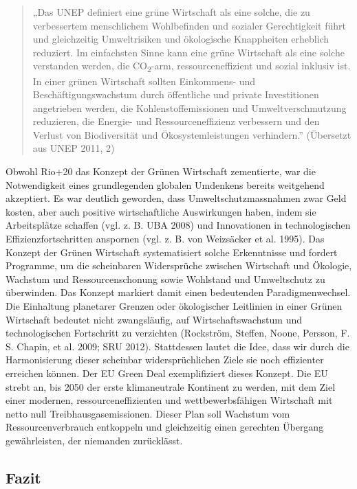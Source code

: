 \documentclass[
  nswissgerman,
  a4paper,
  DIV=11,
  numbers=noendperiod,
  oneside,
  openany]{scrreprt}
\begin{document}
\begin{quote}
„Das UNEP definiert eine grüne Wirtschaft als eine solche, die zu
verbessertem menschlichem Wohlbefinden und sozialer Gerechtigkeit führt
und gleichzeitig Umweltrisiken und ökologische Knappheiten erheblich
reduziert. Im einfachsten Sinne kann eine grüne Wirtschaft als eine
solche verstanden werden, die CO\textsubscript{2}-arm,
ressourceneffizient und sozial inklusiv ist. In einer grünen Wirtschaft
sollten Einkommens- und Beschäftigungswachstum durch öffentliche und
private Investitionen angetrieben werden, die Kohlenstoffemissionen und
Umweltverschmutzung reduzieren, die Energie- und Ressourceneffizienz
verbessern und den Verlust von Biodiversität und Ökosystemleistungen
verhindern.'' (Übersetzt aus UNEP 2011, 2)
\end{quote}

Obwohl Rio+20 das Konzept der Grünen Wirtschaft zementierte, war die
Notwendigkeit eines grundlegenden globalen Umdenkens bereits weitgehend
akzeptiert. Es war deutlich geworden, dass Umweltschutzmassnahmen zwar
Geld kosten, aber auch positive wirtschaftliche Auswirkungen haben,
indem sie Arbeitsplätze schaffen (vgl. z. B. UBA 2008) und Innovationen
in technologischen Effizienzfortschritten anspornen (vgl. z. B. {von
Weizsäcker et al.} 1995). Das Konzept der Grünen Wirtschaft
systematisiert solche Erkenntnisse und fordert Programme, um die
scheinbaren Widersprüche zwischen Wirtschaft und Ökologie, Wachstum und
Ressourcenschonung sowie Wohlstand und Umweltschutz zu überwinden. Das
Konzept markiert damit einen bedeutenden Paradigmenwechsel. Die
Einhaltung planetarer Grenzen oder ökologischer Leitlinien in einer
Grünen Wirtschaft bedeutet nicht zwangsläufig, auf Wirtschaftswachstum
und technologischen Fortschritt zu verzichten (Rockström, Steffen,
Noone, Persson, F. S. Chapin, et al. 2009; SRU 2012). Stattdessen lautet
die Idee, dass wir durch die Harmonisierung dieser scheinbar
widersprüchlichen Ziele sie noch effizienter erreichen können. Der EU
Green Deal exemplifiziert dieses Konzept. Die EU strebt an, bis 2050 der
erste klimaneutrale Kontinent zu werden, mit dem Ziel einer modernen,
ressourceneffizienten und wettbewerbsfähigen Wirtschaft mit netto null
Treibhausgasemissionen. Dieser Plan soll Wachstum vom
Ressourcenverbrauch entkoppeln und gleichzeitig einen gerechten Übergang
gewährleisten, der niemanden zurücklässt.

\subsection{Fazit}\label{fazit-3}
\end{document}
